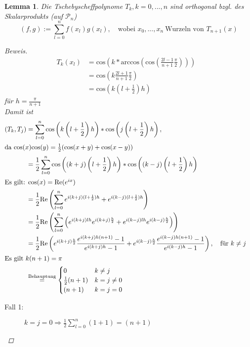 \documentclass[12pt]{article}
\theoremstyle{break}
\newtheorem{lemma}[theorem]{Lemma}
\begin{document}
\begin{lemma}
Die Tschebyscheffpolynome $T_k, k = 0, ..., n$ sind orthogonal bzgl. des Skalarprodukts (auf $\mathcal{P}_n$)
\[(f, g) := \sum_{l=0}^n f(x_l)g(x_l), \quad \text{wobei } x_0, ..., x_n \medspace \text{Wurzeln von } T_{n+1}(x) \]

\begin{proof}[Beweis]\leavevmode
\begin{align*}
T_k(x_l) &= \text{cos}\left(k *\text{arccos}\left( \text{cos} \left( \frac{2l-1}{n+1} \frac{\pi}{2}\right)\right)\right) &\\
&= \text{cos}\left( k \frac{2l+1}{n+1} \frac{\pi}{2}\right) &\\
&= \text{cos}\left(k \left(l+ \frac{1}{2}\right)h \right)
\end{align*}
für $h = \frac{\pi}{n+1}$\\
Damit ist 
\begin{align*}
(T_k, T_j) &= \sum_{l=0}^n \text{cos}\left(k\left(l+\frac{1}{2}\right)h\right) * \text{cos}\left(j\left(l+\frac{1}{2}\right)h\right), &\\
\intertext{da $\text{cos}(x)\text{cos}(y) = \frac{1}{2}(\text{cos}(x+y) + \text{cos}(x-y))$}
&= \frac{1}{2} \sum_{l=0}^n \text{cos}\left(\left(k+j\right)\left(l+\frac{1}{2}\right)h\right) * \text{cos}\left((k-j)\left(l+\frac{1}{2}\right)h\right) &\\
\intertext{Es gilt: $\text{cos}(x) = \text{Re} (e^{ix})$}
&= \frac{1}{2} \text{Re}\left( \sum_{l=0}^n e^{i(k+j)(l+\frac{1}{2})h} + e^{i(k-j)(l+\frac{1}{2})h}\right) &\\
&= \frac{1}{2} \text{Re}\left( \sum_{l=0}^n \left( e^{i(k+j)lh}e^{i(k+j)\frac{h}{2}} + e^{i(k-j)lh}e^{i(k-j)\frac{h}{2}}\right)\right) &\\
&= \frac{1}{2} \text{Re} \left( e^{i(k+j)\frac{h}{2}} \frac{e^{i(k+j)h(n+1)} -1}{ e^{i(k+j)h} - 1} + e^{i(k-j)\frac{h}{2}} \frac{e^{i(k-j)h(n+1)} -1}{ e^{i(k-j)h} - 1}\right), \quad \text{für }k \neq j &\\
\intertext{Es gilt $k(n+1) = \pi$}
&\overset{\text{Behauptung}}{=} \begin{cases}
0 & k \neq j \\
\frac{1}{2} (n+1) & k=j\neq 0 \\
(n+1) & k = j = 0
\end{cases}
\end{align*}
\begin{description}
  \item[Fall 1:] $k=j=0 \Rightarrow \frac{1}{2} \sum_{l=0}^n(1+1) = (n+1)$

\end{description}
\end{proof}
\end{lemma}
\end{document}
